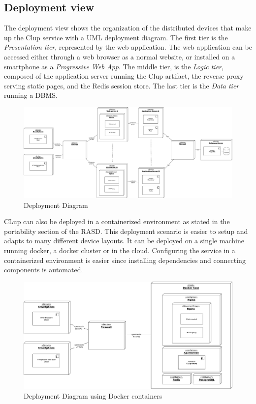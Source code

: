 \subsection{Deployment view}
The deployment view shows the organization of the distributed devices that make up the Clup service with a UML deployment diagram. The first tier is the \emph{Presentation tier}, represented by the web application. The web application can be accessed either through a web browser as a normal website, or installed on a smartphone as a \emph{Progressive Web App}. The middle tier, is the \emph{Logic tier}, composed of the application server running the Clup artifact, the reverse proxy serving static pages, and the Redis session store. The last tier is the \emph{Data tier} running a DBMS.
\begin{figure}[H]
    \centering
    \includegraphics[width=1\textwidth]{Images/deployment-1.pdf}
    \caption{Deployment Diagram}
\end{figure}
CLup can also be deployed in a containerized environment as stated in the portability section of the RASD. This deployment scenario is easier to setup and adapts to many different device layouts. It can be deployed on a single machine running docker, a docker cluster or in the cloud. Configuring the service in a containerized environment is easier since installing dependencies and connecting components is automated.
\begin{figure}[H]
    \centering
    \includegraphics[width=1\textwidth]{Images/deployment-2.pdf}
    \caption{Deployment Diagram using Docker containers}
\end{figure}

